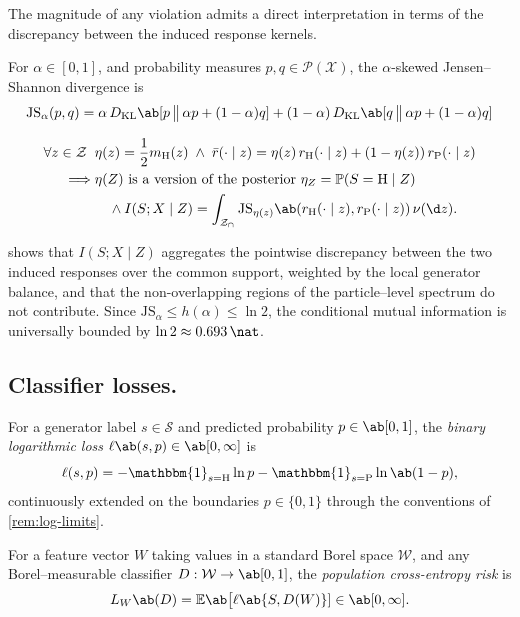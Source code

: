 \documentclass[12pt]{article}
\newcommand{\Herwig}{\mathrm{H}}
\newcommand{\Pythia}{\mathrm{P}}
\newcommand{\E}{\mathbb{E}}
\newcommand{\Prb}{\mathbb{P}}
\newcommand{\KL}{D_{\mathrm{KL}}}
\newcommand{\JS}{\mathrm{JS}}
\newcommand{\Gens}{\mathcal{S}}
\newcommand{\Meas}{\mathcal{P}}
\newcommand{\supp}{\mathcal{Z}_{\cap}}
\newcommand{\1}{\mathbbm{1}}
\renewcommand{\[}{\begin{equation}}
\renewcommand{\]}{\end{equation}}
\begin{document}
    The magnitude of any violation admits a direct interpretation in terms of the discrepancy between the induced response kernels.

    \begin{definition}
        For \(\alpha\in[0,1]\), and probability measures \(p, q \in \Meas(\mathcal{X})\), the \(\alpha\)-skewed Jensen--Shannon divergence is
        \[
            \JS_\alpha(p,q) = \alpha \,\KL\ab[ p \,\big\|\, \alpha p + ( 1 -\alpha ) q ] + (1-\alpha)\, \KL \ab[ q \,\big\|\,\alpha p + ( 1 -\alpha ) q]
        \]
    \end{definition}
    
\begin{proposition}
    \label{prop:js}
        \[
        \label{eq:cmi-js}
        \begin{split}
            \forall z\in\mathcal Z\;\;&\eta(z) = \frac12 m_\Herwig(z) \;\land\; \bar r( \cdot \mid z) = \eta(z)\,r_\Herwig( \cdot \mid z) + ( 1 -\eta(z)) \, r_\Pythia( \cdot \mid z)\\
            \implies & \eta(Z) \text{ is a version of the posterior } \eta_Z = \Prb(S = \Herwig \mid Z)\\
            &\quad \land
            I(S;X\mid Z)=\int_{\supp}\JS_{\eta(z)}\ab(r_\Herwig(\cdot\mid z),r_\Pythia(\cdot\mid z))\,\nu(\d z).
        \end{split}
        \]
    \end{proposition}

     shows that \(I(S;X\mid Z)\) aggregates the pointwise discrepancy between the two induced responses over the common support, weighted by the local generator balance, and that the non-overlapping regions of the particle--level spectrum do not contribute.
    Since \(\JS_\alpha\le h (\alpha)\le\ln2\), the conditional mutual information is universally bounded by \(\ln2\approx\qty{0.693}{\nat}\).

    \subsection{Classifier losses.}

\begin{definition}
    For a generator label \(s \in \Gens\) and predicted probability \(p \in \ab[0, 1]\), the \emph{binary logarithmic loss} \(\ell \ab(s, p) \in \ab[0, \infty]\) is
    \[
        \ell(s, p) = -\1_{s=\Herwig}\ln p - \1_{s=\Pythia}\ln \ab(1-p),
    \]
    continuously extended on the boundaries \(p \in \{0, 1\}\) through the conventions of \cref{rem:log-limits}.
    
    For a feature vector \(W\) taking values in a standard Borel space \(\mathcal{W}\), and any Borel--measurable classifier \(D: \mathcal{W} \to \ab[0, 1]\), the \emph{population cross-entropy risk} is
    \[
        L_W \ab(D) = \E \ab\big[ \ell \ab\{ S, D(W) \} ] \in \ab[0, \infty].
    \]
\end{definition}
\end{document}

